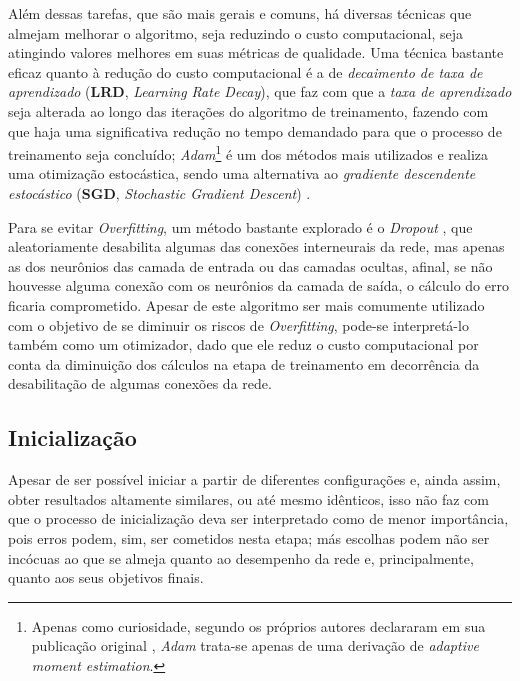Além dessas tarefas, que são mais gerais e comuns, há diversas técnicas que almejam melhorar o algoritmo, seja reduzindo o custo computacional, seja atingindo valores melhores em suas métricas de qualidade. Uma técnica bastante eficaz quanto à redução do custo computacional é a de \textit{decaimento de taxa de aprendizado} (\textbf{LRD}, \textit{Learning Rate Decay}), que faz com que a \textit{taxa de aprendizado} seja alterada ao longo das iterações do algoritmo de treinamento, fazendo com que haja uma significativa redução no tempo demandado para que o processo de treinamento seja concluído; \textit{Adam}\footnote{Apenas como curiosidade, segundo os próprios autores declararam em sua publicação original \citep{kingma2014adam}, \textit{Adam} trata-se apenas de uma derivação de \textit{adaptive moment estimation}.} \citep{kingma2014adam} é um dos métodos mais utilizados e realiza uma otimização estocástica, sendo uma alternativa ao \textit{gradiente descendente estocástico} (\textbf{SGD}, \textit{Stochastic Gradient Descent}) \citep{robbins1951stochastic, kiefer1952stochastic}.


Para se evitar \textit{Overfitting}, um método bastante explorado é o \textit{Dropout} \citep{srivastava2014dropout}, que aleatoriamente desabilita algumas das conexões interneurais da rede, mas apenas as dos neurônios das camada de entrada ou das camadas ocultas, afinal, se não houvesse alguma conexão com os neurônios da camada de saída, o cálculo do erro ficaria comprometido. Apesar de este algoritmo ser mais comumente utilizado com o objetivo de se diminuir os riscos de \textit{Overfitting}, pode-se interpretá-lo também como um otimizador, dado que ele reduz o custo computacional por conta da diminuição dos cálculos na etapa de treinamento em decorrência da desabilitação de algumas conexões da rede.







\subsection{Inicialização}
\label{subsec:ann_initialization}

Apesar de ser possível iniciar a partir de diferentes configurações e, ainda assim, obter resultados altamente similares, ou até mesmo idênticos, isso não faz com que o processo de inicialização deva ser interpretado como de menor importância, pois erros podem, sim, ser cometidos nesta etapa; más escolhas podem não ser incócuas ao que se almeja quanto ao desempenho da rede e, principalmente, quanto aos seus objetivos finais.

